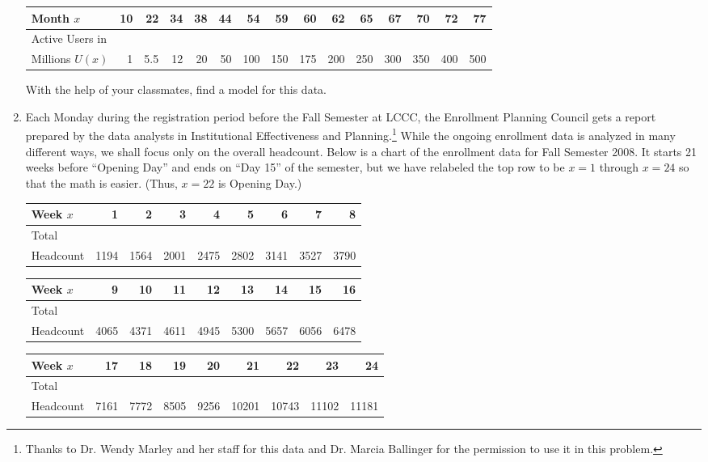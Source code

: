 \documentclass{ximera}
\begin{document}
\begin{enumerate}
\medskip
\small
\noindent \begin{tabular}{|l|r|r|r|r|r|r|r|r|r|r|r|r|r|r|} \hline
Month $x$ & 10 & 22 & 34 & 38 & 44 & 54 & 59 & 60 & 62 & 65 & 67 & 70 & 72 & 77 \\ \hline 
Active Users in & & & & & & & & & & & & & & \\
Millions $U(x)$ & 1 & 5.5 & 12 & 20 & 50 & 100 & 150 & 175 & 200 & 250 & 300 & 350 & 400 & 500\\ \hline
\end{tabular}
\normalsize
\medskip

  With the help of your classmates, find a model for this data.


\item Each Monday during the registration period before the Fall Semester at LCCC, the Enrollment Planning Council gets a report prepared by the data analysts in Institutional Effectiveness and Planning.\footnote{Thanks to Dr. Wendy Marley and her staff for this data and Dr. Marcia Ballinger for the permission to use it  in this problem.}  While the ongoing enrollment data is analyzed in many different ways, we shall focus only on the overall headcount.  Below is a chart of the enrollment data for Fall Semester 2008.  It starts 21 weeks before ``Opening Day'' and ends on ``Day 15'' of the semester, but we have relabeled the top row to be $x = 1$ through $x = 24$ so that the math is easier.  (Thus, $x = 22$ is Opening Day.)


\noindent \begin{tabular}{|l|r|r|r|r|r|r|r|r|} \hline
Week $x$ & 1 & 2 & 3 & 4 & 5 & 6 & 7 & 8 \\ \hline 
Total  & & & & & & & & \\
Headcount & 1194 & 1564 & 2001 & 2475 & 2802 & 3141 & 3527 & 3790 \\ \hline
\end{tabular}

\medskip

\noindent \begin{tabular}{|l|r|r|r|r|r|r|r|r|} \hline
Week $x$ & 9 & 10 & 11 & 12 & 13 & 14 & 15 & 16 \\ \hline 
Total  & & & & & & & & \\
Headcount & 4065 & 4371 & 4611 & 4945 & 5300 & 5657 & 6056 & 6478 \\ \hline
\end{tabular}

\medskip

\noindent \begin{tabular}{|l|r|r|r|r|r|r|r|r|} \hline
Week $x$ & 17 & 18 & 19 & 20 & 21 & 22 & 23 & 24\\ \hline 
Total  & & & & & & & & \\
Headcount & 7161 & 7772 & 8505 & 9256 & 10201 & 10743 & 11102 & 11181 \\ \hline
\end{tabular}


\end{enumerate}
\end{document}
